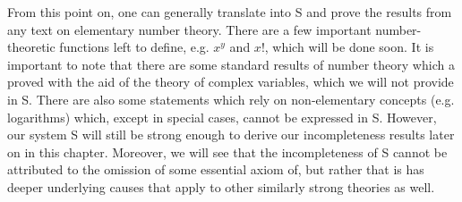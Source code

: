 From this point on, one can generally translate into S and prove the results from any text on elementary number theory. There are a few important number-theoretic functions left to define, e.g. $x^y$ and $x!$, which will be done soon. It is important to note that there are some standard results of number theory which a proved with the aid of the theory of complex variables, which we will not provide in S. There are also some statements which rely on non-elementary concepts (e.g. logarithms) which, except in special cases, cannot be expressed in S. However, our system S will still be strong enough to derive our incompleteness results later on in this chapter. Moreover, we will see that the incompleteness of S cannot be attributed to the omission of some essential axiom of, but rather that is has deeper underlying causes that apply to other similarly strong theories as well.
